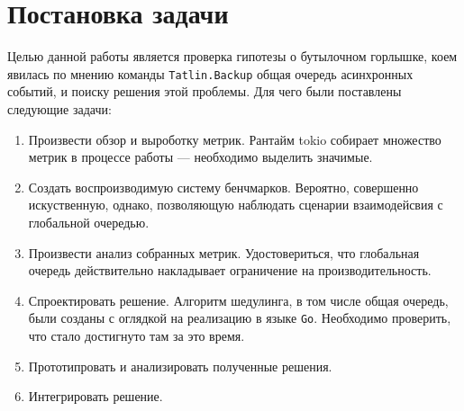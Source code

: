 
\section{Постановка задачи}
\label{sec:task}

Целью данной работы является проверка гипотезы о бутылочном горлышке, коем явилась по мнению команды \verb|Tatlin.Backup| общая очередь асинхронных событий, и поиску решения этой проблемы. Для чего были поставлены следующие задачи:

\begin{enumerate}
    \item Произвести обзор и выроботку метрик. Рантайм tokio собирает множество метрик в процессе работы --- необходимо выделить значимые.
    \item Создать воспроизводимую систему бенчмарков. Вероятно, совершенно искуственную, однако, позволяющую наблюдать сценарии взаимодейсвия с глобальной очередью.
    \item Произвести анализ собранных метрик. Удостовериться, что глобальная очередь действительно накладывает ограничение на производительность.
    \item Спроектировать решение. Алгоритм шедулинга, в том числе общая очередь, были созданы с оглядкой на реализацию в языке \verb|Go|. Необходимо проверить, что стало достигнуто там за это время.
    \item Прототипровать и анализировать полученные решения.
    \item Интегрировать решение.
\end{enumerate}
